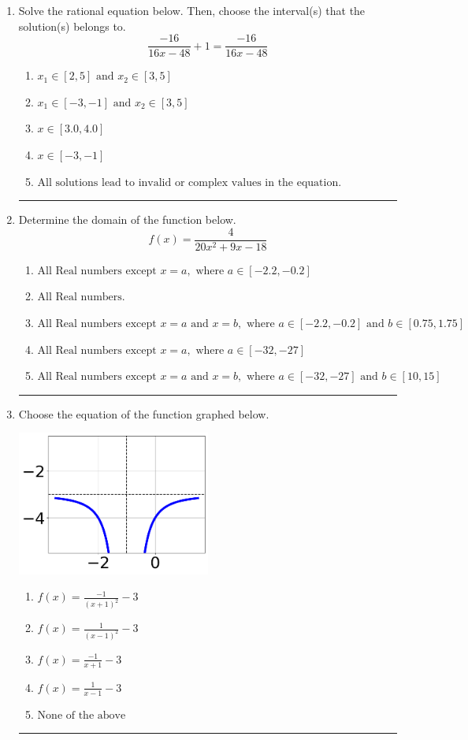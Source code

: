 \documentclass[14pt]{extbook}
\newcommand{\litem}[1]{\item#1\hspace*{-1cm}\rule{\textwidth}{0.4pt}}
\begin{document}
\begin{enumerate}
\litem{
Solve the rational equation below. Then, choose the interval(s) that the solution(s) belongs to.\[ \frac{-16}{16x -48} + 1 = \frac{-16}{16x -48} \]\begin{enumerate}[label=\Alph*.]
\item \( x_1 \in [2, 5] \text{ and } x_2 \in [3,5] \)
\item \( x_1 \in [-3, -1] \text{ and } x_2 \in [3,5] \)
\item \( x \in [3.0,4.0] \)
\item \( x \in [-3,-1] \)
\item \( \text{All solutions lead to invalid or complex values in the equation.} \)

\end{enumerate} }
\litem{
Determine the domain of the function below.\[ f(x) = \frac{4}{20x^{2} +9 x -18} \]\begin{enumerate}[label=\Alph*.]
\item \( \text{All Real numbers except } x = a, \text{ where } a \in [-2.2, -0.2] \)
\item \( \text{All Real numbers.} \)
\item \( \text{All Real numbers except } x = a \text{ and } x = b, \text{ where } a \in [-2.2, -0.2] \text{ and } b \in [0.75, 1.75] \)
\item \( \text{All Real numbers except } x = a, \text{ where } a \in [-32, -27] \)
\item \( \text{All Real numbers except } x = a \text{ and } x = b, \text{ where } a \in [-32, -27] \text{ and } b \in [10, 15] \)

\end{enumerate} }
\litem{
Choose the equation of the function graphed below.
\begin{center}
    \includegraphics[width=0.5\textwidth]{../Figures/rationalGraphToEquationCopyC.png}
\end{center}
\begin{enumerate}[label=\Alph*.]
\item \( f(x) = \frac{-1}{(x + 1)^2} - 3 \)
\item \( f(x) = \frac{1}{(x - 1)^2} - 3 \)
\item \( f(x) = \frac{-1}{x + 1} - 3 \)
\item \( f(x) = \frac{1}{x - 1} - 3 \)
\item \( \text{None of the above} \)


\end{enumerate}}
\end{enumerate}
\end{document}
